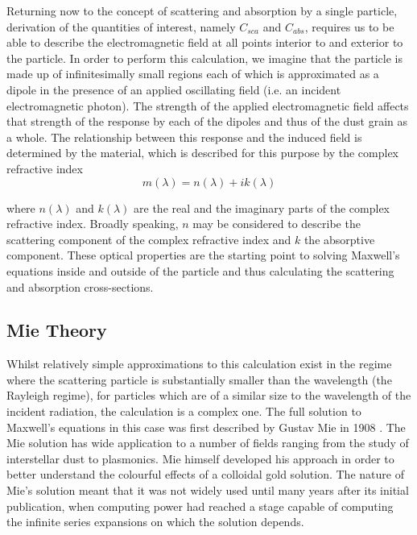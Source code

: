 Returning now to the concept of scattering and absorption by a single particle, derivation of the quantities of interest, namely $C_{sca}$ and $C_{abs}$, requires us to be able to describe the electromagnetic field at all points interior to and exterior to the particle.  In order to perform this calculation, we imagine that the particle is made up of infinitesimally small regions each of which is approximated as a dipole in the presence of an applied oscillating field (i.e. an incident electromagnetic photon).  The strength of the applied electromagnetic field affects that strength of the response by each of the dipoles and thus of the dust grain as a whole.  The relationship between this response and the induced field is determined by the material, which is described for this purpose by the complex refractive index 
\begin{equation}
m(\lambda)=n(\lambda)+ik(\lambda)
\end{equation}

\noindent where $n(\lambda)$ and $k(\lambda)$ are the real and the imaginary parts of the complex refractive index.  Broadly speaking, $n$ may be considered to describe the scattering component of the complex refractive index and $k$ the absorptive component.  These optical properties are the starting point to solving Maxwell's equations inside and outside of the particle and thus calculating the scattering and absorption cross-sections.

\subsection{Mie Theory}
\label{scn:mie_theory}

Whilst relatively simple approximations to this calculation exist in the regime where the scattering particle is substantially smaller than the wavelength (the Rayleigh regime), for particles which are of a similar size to the wavelength of the incident radiation, the calculation is a complex one.  The full solution to Maxwell's equations in this case was first described by Gustav Mie in 1908 \citep{Mie1908}.  The Mie solution has wide application to a number of fields ranging from the study of interstellar dust to plasmonics.  Mie himself developed his approach in order to better understand the colourful effects of a colloidal gold solution.  The nature of Mie's solution meant that it was not widely used until many years after its initial publication, when computing power had reached a stage capable of computing the infinite series expansions on which the solution depends.

